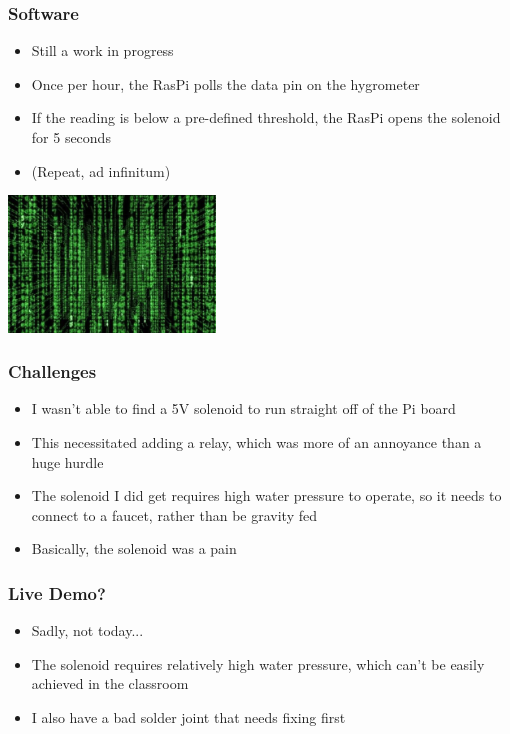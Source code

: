 \documentclass{beamer}
\begin{document}
\begin{frame}
    \frametitle{Software}
    \begin{minipage}{0.52\textwidth}
        \begin{itemize}
            \item Still a work in progress
            \item Once per hour, the RasPi polls the data pin on the hygrometer
            \item If the reading is below a pre-defined threshold, the RasPi opens the
                  solenoid for 5 seconds
            \item (Repeat, ad infinitum)
        \end{itemize}
    \end{minipage}%
    \begin{minipage}{0.45\textwidth}
        \includegraphics[width=5.5cm]{img/matrix}
    \end{minipage}%
\end{frame}

\begin{frame}
    \frametitle{Challenges}
    \begin{itemize}
        \item I wasn't able to find a 5V solenoid to run straight off of the Pi board
        \item This necessitated adding a relay, which was more of an annoyance than a huge hurdle
        \pause
        \item The solenoid I did get requires high water pressure to operate, so it needs to connect
              to a faucet, rather than be gravity fed
        \pause
        \item Basically, the solenoid was a pain
    \end{itemize}
\end{frame}

\begin{frame}
    \frametitle{Live Demo?}
    \begin{itemize}
        \item Sadly, not today...
        \pause
        \item The solenoid requires relatively high water pressure, which can't
            be easily achieved in the classroom
        \item I also have a bad solder joint that needs fixing first
    \end{itemize}
\end{frame}
\end{document}
